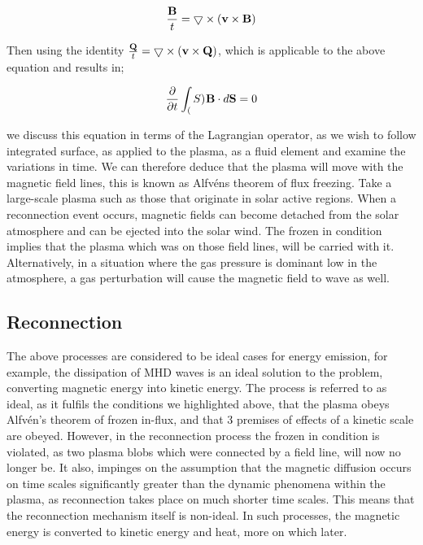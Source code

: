 \begin{equation}
	\frac{\mathbf{B}}{t} = \bigtriangledown \times (\mathbf{v} \times \mathbf{B})
\end{equation}

\noindent Then using the identity $\frac{\mathbf{Q}}{t} = \bigtriangledown \times (\mathbf{v} \times \mathbf{Q})$, which is applicable to the above equation and results in;

\begin{equation}
	\frac{\partial }{\partial t } \int_(S)^{} \mathbf{B} \cdot d\mathbf{S} = 0
\end{equation}

\noindent we discuss this equation in terms of the Lagrangian operator, as we wish to follow integrated surface, as applied to the plasma, as a fluid element and examine the variations in time.
We can therefore deduce that the plasma will move with the magnetic field lines, this is known as Alfv{\'e}ns theorem of flux freezing.
Take a large-scale plasma such as those that originate in solar active regions. 
When a reconnection event occurs, magnetic fields can become detached from the solar atmosphere and can be ejected into the solar wind.
The frozen in condition implies that the plasma which was on those field lines, will be carried with it.
Alternatively, in a situation where the gas pressure is dominant low in the atmosphere, a gas perturbation will cause the magnetic field to wave as well.
 


\subsection{Reconnection}
\label{sec:recon}

The above processes are considered to be ideal cases for energy emission, for example, the dissipation of MHD waves is an ideal solution to the problem, converting magnetic energy into kinetic energy.
The process is referred to as ideal, as it fulfils the conditions we highlighted above, that the plasma obeys Alfv{\'e}n's theorem of frozen in-flux, and that 3 premises of effects of a kinetic scale are obeyed.
However, in the reconnection process the frozen in condition is violated, as two plasma blobs which were connected by a field line, will now no longer be.
It also, impinges on the assumption that the magnetic diffusion occurs on time scales significantly greater than the dynamic phenomena within the plasma, as reconnection takes place on much shorter time scales.
This means that the reconnection mechanism itself is non-ideal.
In such processes, the magnetic energy is converted to kinetic energy and heat, more on which later.

